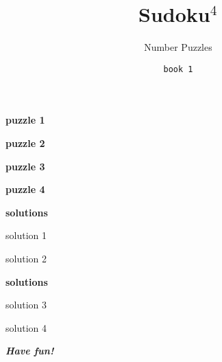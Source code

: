 \documentclass[fontsize=24pt,letterpaper]{scrartcl}
\title{Sudoku$^4$}
\author{Number Puzzles}
\date{\texttt{book 1}}
\renewcommand*\sudokuformat[1]{\Large\sffamily#1}
\begin{document}
\maketitle
\setcounter{page}{0}
\thispagestyle{empty}
\clearpage

{\Large \bfseries \sffamily puzzle 1}
\vspace{2cm}

\clearpage
\begin{flushright}
{\Large \bfseries \sffamily puzzle 2}
\end{flushright}
\vspace{1cm}


\clearpage
{\Large \bfseries \sffamily puzzle 3}
\vspace{2cm}


\clearpage
\begin{flushright}
{\Large \bfseries \sffamily puzzle 4}
\end{flushright}
\vspace{1cm}


\clearpage

{\Large \bfseries \sffamily solutions}
\setlength\sudokusize{8cm}
\renewcommand*\sudokuformat[1]{\sffamily#1}
\vspace{1cm}

\begin{center}
    solution 1
\end{center}
\vspace{0.2cm}

\begin{center}
    solution 2
\end{center}


\clearpage
\begin{flushright}
{\Large \bfseries \sffamily solutions}
\end{flushright}
\vspace{1cm}

\begin{center}
    solution 3
\end{center}

\begin{center}
    solution 4
\end{center}
\clearpage

{\centering\Huge\itshape\bfseries Have fun!\par}
\end{document}
